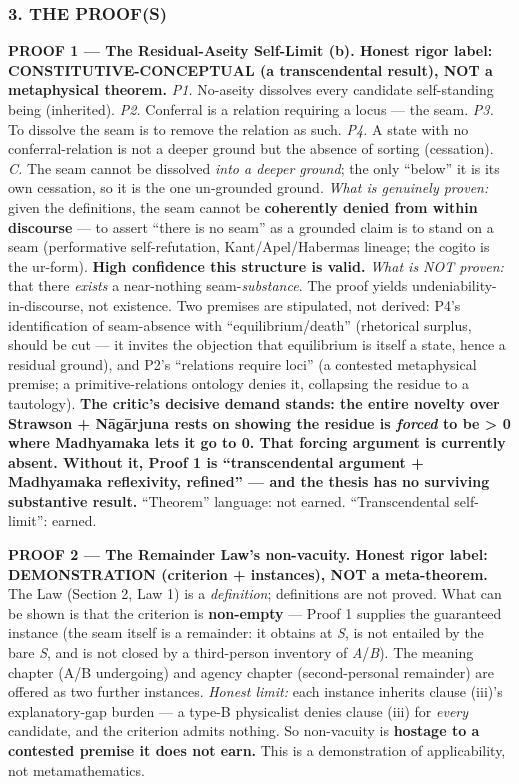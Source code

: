 \documentclass[11pt]{article}
\begin{document}
\subsubsection*{3. THE PROOF(S)}

\textbf{PROOF 1 — The Residual-Aseity Self-Limit (b). Honest rigor label: CONSTITUTIVE-CONCEPTUAL (a transcendental result), NOT a metaphysical theorem.} \emph{P1.} No-aseity dissolves every candidate self-standing being (inherited). \emph{P2.} Conferral is a relation requiring a locus — the seam. \emph{P3.} To dissolve the seam is to remove the relation as such. \emph{P4.} A state with no conferral-relation is not a deeper ground but the absence of sorting (cessation). \emph{C.} The seam cannot be dissolved \emph{into a deeper ground}; the only ``below'' it is its own cessation, so it is the one un-grounded ground. \emph{What is genuinely proven:} given the definitions, the seam cannot be \textbf{coherently denied from within discourse} — to assert ``there is no seam'' as a grounded claim is to stand on a seam (performative self-refutation, Kant/\allowbreak{}Apel/\allowbreak{}Habermas lineage; the cogito is the ur-form). \textbf{High confidence this structure is valid.} \emph{What is NOT proven:} that there \emph{exists} a near-nothing seam-\emph{substance}. The proof yields undeniability-in-discourse, not existence. Two premises are stipulated, not derived: P4's identification of seam-absence with ``equilibrium/\allowbreak{}death'' (rhetorical surplus, should be cut — it invites the objection that equilibrium is itself a state, hence a residual ground), and P2's ``relations require loci'' (a contested metaphysical premise; a primitive-relations ontology denies it, collapsing the residue to a tautology). \textbf{The critic's decisive demand stands: the entire novelty over Strawson + Nāgārjuna rests on showing the residue is \emph{forced} to be > 0 where Madhyamaka lets it go to 0. That forcing argument is currently absent. Without it, Proof 1 is ``transcendental argument + Madhyamaka reflexivity, refined'' — and the thesis has no surviving substantive result.} ``Theorem'' language: not earned. ``Transcendental self-limit'': earned.

\textbf{PROOF 2 — The Remainder Law's non-vacuity. Honest rigor label: DEMONSTRATION (criterion + instances), NOT a meta-theorem.} The Law (Section 2, Law 1) is a \emph{definition}; definitions are not proved. What can be shown is that the criterion is \textbf{non-empty} — Proof 1 supplies the guaranteed instance (the seam itself is a remainder: it obtains at \emph{S}, is not entailed by the bare \emph{S}, and is not closed by a third-person inventory of \emph{A}/\allowbreak{}\emph{B}). The meaning chapter (A/\allowbreak{}B undergoing) and agency chapter (second-personal remainder) are offered as two further instances. \emph{Honest limit:} each instance inherits clause (iii)'s explanatory-gap burden — a type-B physicalist denies clause (iii) for \emph{every} candidate, and the criterion admits nothing. So non-vacuity is \textbf{hostage to a contested premise it does not earn.} This is a demonstration of applicability, not metamathematics.
\end{document}
